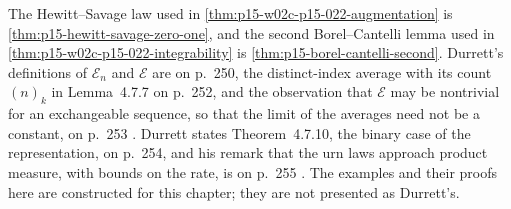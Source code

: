The Hewitt--Savage law used in
\cref{thm:p15-w02c-p15-022-augmentation} is
\cref{thm:p15-hewitt-savage-zero-one}, and the second Borel--Cantelli
lemma used in \cref{thm:p15-w02c-p15-022-integrability} is
\cref{thm:p15-borel-cantelli-second}. Durrett's definitions of
\(\mathcal E_n\) and \(\mathcal E\) are on p.~250, the
distinct-index average with its count \((n)_k\) in Lemma~4.7.7 on
p.~252, and the observation that \(\mathcal E\) may be nontrivial for an
exchangeable sequence, so that the limit of the averages need not be a
constant, on p.~253 \cite[pp.~250--253]{DurrettPTEAuthor2019}. Durrett
states Theorem~4.7.10, the binary case of the representation, on
p.~254, and his remark that the urn laws approach product measure, with
bounds on the rate, is on p.~255 \cite[pp.~254--255]{DurrettPTEAuthor2019}. The
examples and their proofs here are constructed for this chapter; they
are not presented as Durrett's.
